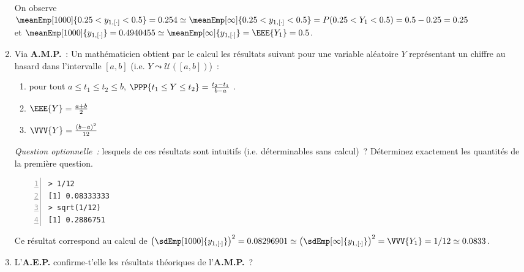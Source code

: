 \documentclass[10pt]{report}
\begin{document}
\begin{exercice}
\begin{enumerate}
\begin{Correction}
On observe\\
$\meanEmp[1000]{0.25<y_{1,[\cdot]}<0.5} =0.254 \simeq \meanEmp[\infty]{0.25<y_{1,[\cdot]}<0.5} =P(0.25<Y_1<0.5)=0.5-0.25=0.25$ \\
et
$\meanEmp[1000]{y_{1,[\cdot]}} =0.4940455 \simeq \meanEmp[\infty]{y_{1,[\cdot]}} =\EEE{Y_1}=0.5$.
\end{Correction}

\item Via \textbf{A.M.P.}~: Un mathématicien obtient par le calcul les résultats suivant pour une variable aléatoire $Y$ représentant un chiffre au hasard dans l'intervalle $[a,b]$ (i.e. $Y\leadsto\mathcal{U}([a,b])$)~: 
\begin{enumerate}
\item pour tout $a\leq t_1 \leq t_2\leq b$, $\PPP{t_1\leq Y \leq t_2}=\frac{t_2-t_1}{b-a}$ .
\item $\EEE{Y}=\frac{a+b}2$
\item $\VVV{Y}=\frac{(b-a)^2}{12}$
\end{enumerate}
\noindent \textit{Question optionnelle~:} lesquels de ces résultats sont intuitifs (i.e. déterminables sans calcul)~?
Déterminez exactement les quantités de la première question.
\begin{Verbatim}[frame=leftline,fontfamily=tt,fontshape=n,numbers=left]
> 1/12
[1] 0.08333333
> sqrt(1/12)
[1] 0.2886751
\end{Verbatim}


\begin{Correction}
Ce résultat correspond au calcul de
$\left(\sdEmp[1000]{y_{1,[\cdot]}}\right)^2 =0.08296901 \simeq \left(\sdEmp[\infty]{y_{1,[\cdot]}} \right)^2=\VVV{Y_1}=1/12\simeq 0.0833$.
\end{Correction}

\item L'\textbf{A.E.P.} confirme-t'elle les résultats théoriques de l'\textbf{A.M.P.}~?
\end{enumerate}
\end{exercice}
\end{document}

